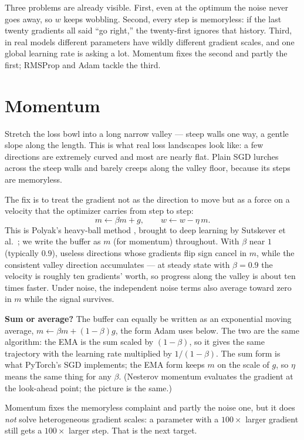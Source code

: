 \documentclass[10pt,conference]{IEEEtran}
\begin{document}
Three problems are already visible. First, even at the optimum the noise never
goes away, so $w$ keeps wobbling. Second, every step is memoryless: if the last
twenty gradients all said ``go right,'' the twenty-first ignores that history.
Third, in real models different parameters have wildly different gradient scales,
and one global learning rate is asking a lot. Momentum fixes the second and
partly the first; RMSProp and Adam tackle the third.

\section{Momentum}
Stretch the loss bowl into a long narrow valley --- steep walls one way, a gentle
slope along the length. This is what real loss landscapes look like: a few
directions are extremely curved and most are nearly flat. Plain SGD lurches
across the steep walls and barely creeps along the valley floor, because its
steps are memoryless.

The fix is to treat the gradient not as the direction to move but as a force on a
velocity that the optimizer carries from step to step:
\begin{equation}
m \leftarrow \beta m + g, \qquad w \leftarrow w - \eta\, m.
\end{equation}
This is Polyak's heavy-ball method \cite{ref17}, brought to deep learning by
Sutskever et al.\ \cite{ref19}; we write the buffer as $m$ (for momentum)
throughout. With $\beta$ near $1$ (typically $0.9$), useless directions whose gradients flip
sign cancel in $m$, while the consistent valley direction accumulates --- at
steady state with $\beta=0.9$ the velocity is roughly ten gradients' worth, so
progress along the valley is about ten times faster. Under noise, the independent
noise terms also average toward zero in $m$ while the signal survives.

\textbf{Sum or average?} The buffer can equally be written as an exponential
moving average, $m \leftarrow \beta m + (1-\beta) g$, the form Adam uses below.
The two are the same algorithm: the EMA is the sum scaled by $(1-\beta)$, so it
gives the same trajectory with the learning rate multiplied by $1/(1-\beta)$. The
sum form is what PyTorch's SGD implements; the EMA form keeps $m$ on the scale of
$g$, so $\eta$ means the same thing for any $\beta$. (Nesterov momentum
\cite{ref18} evaluates the gradient at the look-ahead point; the picture is the
same.)

Momentum fixes the memoryless complaint and partly the noise one, but it does
\emph{not} solve heterogeneous gradient scales: a parameter with a $100\times$
larger gradient still gets a $100\times$ larger step. That is the next target.
\end{document}
